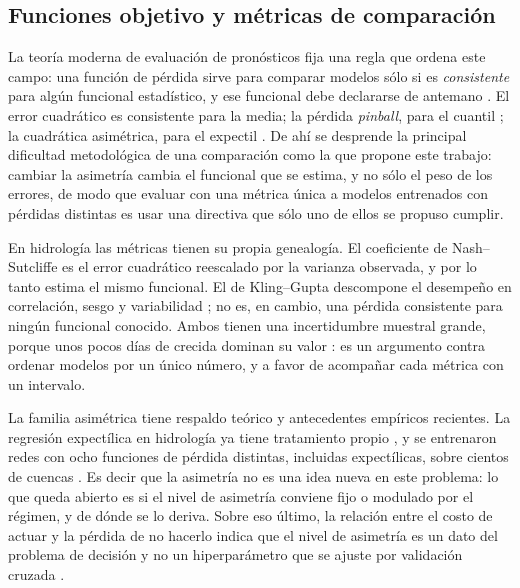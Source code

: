 \subsection{Funciones objetivo y métricas de comparación}

La teoría moderna de evaluación de pronósticos fija una regla que ordena este campo: una función
de pérdida sirve para comparar modelos sólo si es \textit{consistente} para algún funcional
estadístico, y ese funcional debe declararse de antemano
\cite{gneiting-2011-making-evaluating-point-forecasts}.
El error cuadrático es consistente para la media; la pérdida \textit{pinball}, para el cuantil
\cite{koenker-bassett-1978}; la cuadrática asimétrica, para el expectil
\cite{newey-powell-1987}.
De ahí se desprende la principal dificultad metodológica de una comparación como la que propone
este trabajo: cambiar la asimetría cambia el funcional que se estima, y no sólo el peso de los
errores, de modo que evaluar con una métrica única a modelos entrenados con pérdidas distintas es
usar una directiva que sólo uno de ellos se propuso cumplir.

En hidrología las métricas tienen su propia genealogía.
El coeficiente de Nash--Sutcliffe \cite{nash-sutcliffe-1970} es el error cuadrático reescalado por
la varianza observada, y por lo tanto estima el mismo funcional.
El de Kling--Gupta descompone el desempeño en correlación, sesgo y variabilidad
\cite{gupta-2009-kge}; no es, en cambio, una pérdida consistente para ningún funcional conocido.
Ambos tienen una incertidumbre muestral grande, porque unos pocos días de crecida dominan su valor
\cite{clark-2021-abuse-performance-metrics}: es un argumento contra ordenar modelos por un único
número, y a favor de acompañar cada métrica con un intervalo.

La familia asimétrica tiene respaldo teórico y antecedentes empíricos recientes.
La regresión expectílica en hidrología ya tiene tratamiento propio
\cite{tyralis-2023-expectile-hydrological}, y se entrenaron redes con ocho funciones de pérdida
distintas, incluidas expectílicas, sobre cientos de cuencas
\cite{dahal-2026-ensemble-diverse-loss-functions}.
Es decir que la asimetría no es una idea nueva en este problema: lo que queda abierto es si el
nivel de asimetría conviene fijo o modulado por el régimen, y de dónde se lo deriva.
Sobre eso último, la relación entre el costo de actuar y la pérdida de no hacerlo indica que el
nivel de asimetría es un dato del problema de decisión y no un hiperparámetro que se ajuste por
validación cruzada \cite{matte-2017-beyond-cost-loss}.

